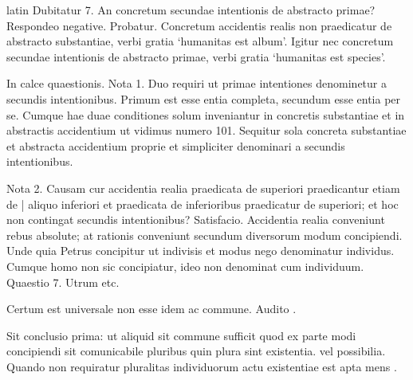 \begin{otherlanguage*}{latin}
\pstart
Dubitatur 7. An concretum secundae intentionis de abstracto primae? Respondeo negative. Probatur. Concretum accidentis realis non praedicatur de abstracto substantiae, verbi gratia `humanitas est album'. Igitur nec concretum secundae intentionis de abstracto primae, verbi gratia `humanitas est species'. 
\pend

\pstart
In calce quaestionis. Nota 1. Duo requiri ut primae intentiones denominetur a secundis intentionibus. Primum est esse entia completa, secundum esse entia per se. Cumque hae duae conditiones solum inveniantur in concretis substantiae et in abstractis accidentium ut vidimus numero 101. Sequitur sola concreta substantiae et abstracta accidentium proprie et simpliciter denominari a secundis intentionibus. 
\pend

\pstart
Nota 2. Causam cur accidentia realia praedicata de superiori praedicantur etiam de \textnormal{|}  aliquo inferiori et praedicata de inferioribus praedicatur de superiori; et hoc non contingat secundis intentionibus? Satisfacio. Accidentia realia conveniunt rebus absolute; at rationis conveniunt secundum diversorum modum concipiendi. Unde quia Petrus concipitur ut indivisis et modus nego denominatur individus. Cumque homo non sic concipiatur, ideo non denominat cum individuum. Quaestio 7. Utrum etc. 
\pend

\pstart
{}
\pend

\pstart
Certum est universale non esse idem ac commune. Audito . 
\pend

\pstart
Sit conclusio prima:
ut aliquid sit commune sufficit quod ex parte modi concipiendi sit comunicabile pluribus quin plura sint existentia. vel possibilia. Quando non requiratur pluralitas individuorum actu existentiae est apta mens . 
\pend


\end{otherlanguage*}

